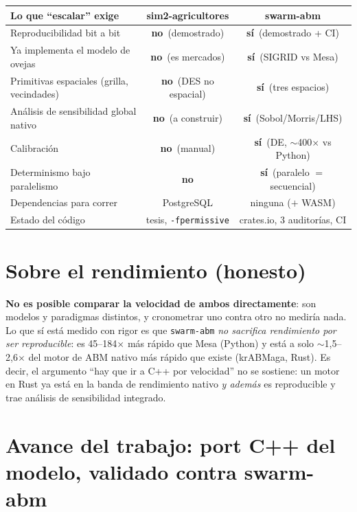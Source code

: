 \documentclass[11pt,a4paper]{article}
\newcommand{\si}{\textcolor{ok}{\textbf{sí}}}
\newcommand{\nno}{\textcolor{no}{\textbf{no}}}
\newcommand{\code}[1]{\texttt{\small #1}}
\begin{document}
\renewcommand{\arraystretch}{1.3}
\begin{center}
\begin{tabular}{>{\raggedright\arraybackslash}p{7.4cm} c c}
\toprule
\textbf{Lo que ``escalar'' exige} & \textbf{sim2-agricultores} & \textbf{swarm-abm} \\
\midrule
Reproducibilidad bit a bit & \nno\ (demostrado) & \si\ (demostrado + CI) \\
Ya implementa el modelo de ovejas & \nno\ (es mercados) & \si\ (SIGRID vs Mesa) \\
Primitivas espaciales (grilla, vecindades) & \nno\ (DES no espacial) & \si\ (tres espacios) \\
Análisis de sensibilidad global nativo & \nno\ (a construir) & \si\ (Sobol/Morris/LHS) \\
Calibración & \nno\ (manual) & \si\ (DE, $\sim$400$\times$ vs Python) \\
Determinismo bajo paralelismo & \nno & \si\ (paralelo $=$ secuencial) \\
Dependencias para correr & PostgreSQL & ninguna ($+$ WASM) \\
Estado del código & tesis, \code{-fpermissive} & crates.io, 3 auditorías, CI \\
\bottomrule
\end{tabular}
\end{center}

\section{Sobre el rendimiento (honesto)}

\textbf{No es posible comparar la velocidad de ambos directamente}: son modelos y
paradigmas distintos, y cronometrar uno contra otro no mediría nada. Lo que sí
está medido con rigor es que \code{swarm-abm} \emph{no sacrifica rendimiento por
ser reproducible}: es 45--184$\times$ más rápido que Mesa (Python) y está a solo
$\sim$1,5--2,6$\times$ del motor de ABM nativo más rápido que existe (krABMaga,
Rust). Es decir, el argumento ``hay que ir a C++ por velocidad'' no se sostiene:
un motor en Rust ya está en la banda de rendimiento nativo \emph{y además} es
reproducible y trae análisis de sensibilidad integrado.

\section{Avance del trabajo: port C++ del modelo, validado contra swarm-abm}
\end{document}
